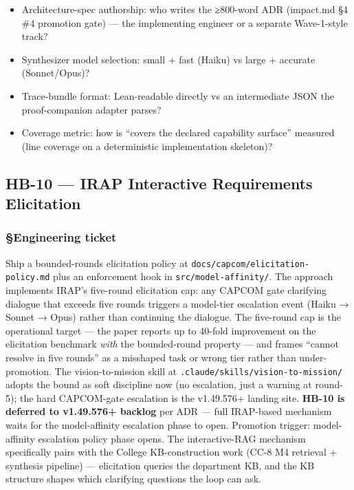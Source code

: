 \documentclass[11pt,letterpaper]{article}
\providecommand{\tightlist}{\setlength{\itemsep}{0pt}\setlength{\parskip}{0pt}}
\begin{document}
\begin{itemize}
\tightlist
\item
  Architecture-spec authorship: who writes the ≥800-word ADR (impact.md
  §4 \#4 promotion gate) --- the implementing engineer or a separate
  Wave-1-style track?
\item
  Synthesizer model selection: small + fast (Haiku) vs large + accurate
  (Sonnet/Opus)?
\item
  Trace-bundle format: Lean-readable directly vs an intermediate JSON
  the proof-companion adapter parses?
\item
  Coverage metric: how is ``covers the declared capability surface''
  measured (line coverage on a deterministic implementation skeleton)?
\end{itemize}


\subsection{HB-10 — IRAP Interactive Requirements Elicitation}
\subsubsection{§Engineering ticket}

Ship a bounded-rounds elicitation policy at
\texttt{docs/capcom/elicitation-policy.md} plus an enforcement hook in
\texttt{src/model-affinity/}. The approach implements IRAP's five-round
elicitation cap: any CAPCOM gate clarifying dialogue that exceeds five
rounds triggers a model-tier escalation event (Haiku → Sonnet → Opus)
rather than continuing the dialogue. The five-round cap is the
operational target --- the paper reports up to 40-fold improvement on
the elicitation benchmark \emph{with} the bounded-round property --- and
frames ``cannot resolve in five rounds'' as a misshaped task or wrong
tier rather than under-promotion. The vision-to-mission skill at
\texttt{.claude/skills/vision-to-mission/} adopts the bound as soft
discipline now (no escalation, just a warning at round-5); the hard
CAPCOM-gate escalation is the v1.49.576+ landing site. \textbf{HB-10 is
deferred to v1.49.576+ backlog} per ADR --- full IRAP-based mechanism
waits for the model-affinity escalation phase to open. Promotion
trigger: model-affinity escalation policy phase opens. The
interactive-RAG mechanism specifically pairs with the College
KB-construction work (CC-8 M4 retrieval + synthesis pipeline) ---
elicitation queries the department KB, and the KB structure shapes which
clarifying questions the loop can ask.
\end{document}
